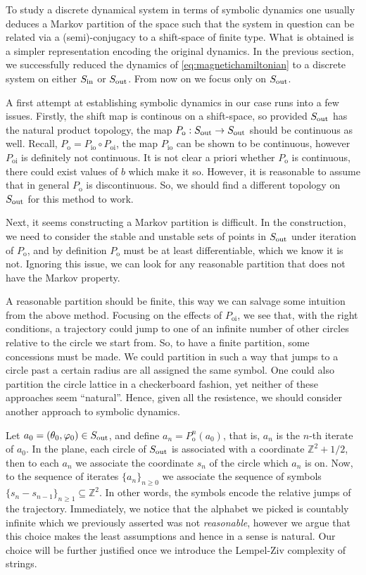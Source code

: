 To study a discrete dynamical system in terms of symbolic dynamics one usually deduces a Markov partition of the space such that the system in question can be related via a (semi)-conjugacy to a shift-space of finite type. What is obtained is a simpler representation encoding the original dynamics. In the previous section, we successfully reduced the dynamics of \eqref{eq:magnetichamiltonian} to a discrete system on either $S_\text{in}$ or $S_\text{out}$. From now on we focus only on $S_\text{out}$.

A first attempt at establishing symbolic dynamics in our case runs into a few issues. Firstly, the shift map is continous on a shift-space, so provided $S_\text{out}$ has the natural product topology, the map $P_\text{o}:S_\text{out}\to S_\text{out}$ should be continuous as well. Recall, $P_\text{o} = P_\text{io}\circ P_\text{oi}$, the map $P_\text{io}$ can be shown to be continuous, however $P_\text{oi}$ is definitely not continuous. It is not clear a priori whether $P_\text{o}$ is continuous, there could exist values of $b$ which make it so. However, it is reasonable to assume that in general $P_\text{o}$ is discontinuous. So, we should find a different topology on $S_\text{out}$ for this method to work.

Next, it seems constructing a Markov partition is difficult. In the construction, we need to consider the stable and unstable sets of points in $S_\text{out}$ under iteration of $P_\text{o}$, and by definition $P_\text{o}$ must be at least differentiable, which we know it is not. Ignoring this issue, we can look for any reasonable partition that does not have the Markov property. 

A reasonable partition should be finite, this way we can salvage some intuition from the above method. Focusing on the effects of $P_\text{oi}$, we see that, with the right conditions, a trajectory could jump to one of an infinite number of other circles relative to the circle we start from. So, to have a finite partition, some concessions must be made. We could partition in such a way that jumps to a circle past a certain radius are all assigned the same symbol. One could also partition the circle lattice in a checkerboard fashion, yet neither of these approaches seem ``natural''. Hence, given all the resistence, we should consider another approach to symbolic dynamics.

Let $a_0=(\theta_0,\varphi_0)\in S_\text{out}$, and define $a_n=P_\text{o}^n(a_0)$, that is, $a_n$ is the $n$-th iterate of $a_0$. In the plane, each circle of $S_\text{out}$ is associated with a coordinate $\mathbb Z^2+1/2$, then to each $a_n$ we associate the coordinate $s_n$ of the circle which $a_n$ is on. Now, to the sequence of iterates $\{a_n\}_{n\ge 0}$ we associate the sequence of symbols $\{s_{n}-s_{n-1}\}_{n\ge1}\subseteq \mathbb Z^2$. In other words, the symbols encode the relative jumps of the trajectory. Immediately, we notice that the alphabet we picked is countably infinite which we previously asserted was not \textit{reasonable}, however we argue that this choice makes the least assumptions and hence in a sense is natural. Our choice will be further justified once we introduce the Lempel-Ziv complexity of strings.
